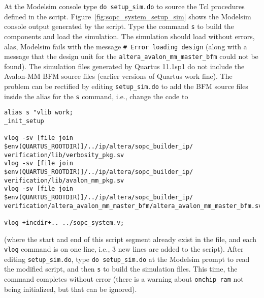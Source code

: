 \documentclass[10pt,twoside]{article}
\begin{document}
At the Modelsim console type \verb+do setup_sim.do+ to
source the Tcl procedures defined in the
script. Figure~\ref{fig:sopc_system_setup_sim} shows the Modelsim
console output generated by the script. Type the command
\verb+s+ to build the components and load the simulation.
The simulation should load without errors, alas, Modelsim
fails with the message \verb+# Error loading design+
(along with a message that the design unit for the
\verb+altera_avalon_mm_master_bfm+ could not be found)\label{bug:4}.
The simulation files generated by Quartus 11.1sp1 do not
include the Avalon-MM BFM source files (earlier versions of
Quartus work fine). The problem can be rectified by editing
\verb+setup_sim.do+ to add the BFM source files inside the
alias for the \verb+s+ command, i.e., change the code to
%
\begin{verbatim}
alias s "vlib work;
_init_setup

vlog -sv [file join $env(QUARTUS_ROOTDIR)]/../ip/altera/sopc_builder_ip/
verification/lib/verbosity_pkg.sv
vlog -sv [file join $env(QUARTUS_ROOTDIR)]/../ip/altera/sopc_builder_ip/
verification/lib/avalon_mm_pkg.sv
vlog -sv [file join $env(QUARTUS_ROOTDIR)]/../ip/altera/sopc_builder_ip/
verification/altera_avalon_mm_master_bfm/altera_avalon_mm_master_bfm.sv
 
vlog +incdir+.. ../sopc_system.v;
\end{verbatim}
%
(where the start and end of this script segment already exist in the file, and
each \verb+vlog+ command is on one line, i.e., 3 new lines are added
to the script).
After editing \verb+setup_sim.do+, type \verb+do setup_sim.do+ at
the Modelsim prompt to read the modified script, and then
\verb+s+ to build the simulation files.
This time, the command completes without error (there is a
warning about \verb+onchip_ram+ not being initialized, but
that can be ignored).
\end{document}
